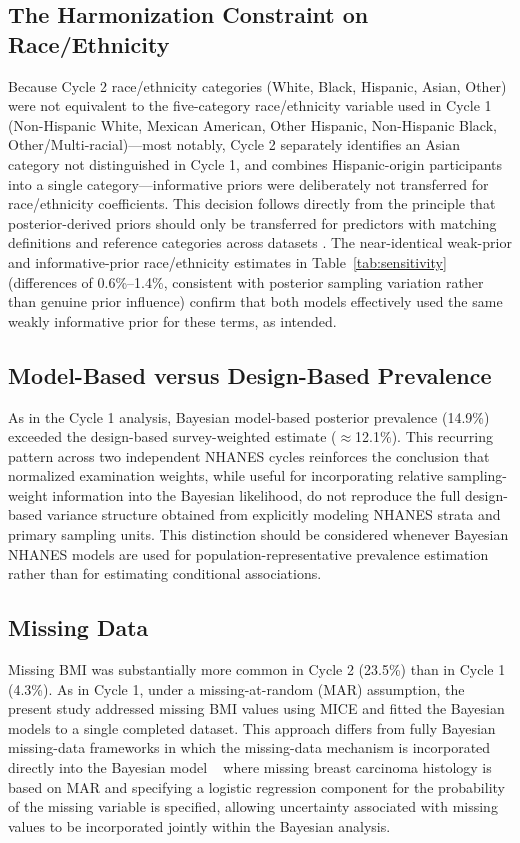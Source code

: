 \documentclass[11pt]{article}
\begin{document}
\subsection{The Harmonization Constraint on Race/Ethnicity}
Because Cycle 2 race/ethnicity categories (White, Black, Hispanic, Asian,
Other) were not equivalent to the five-category race/ethnicity variable used
in Cycle 1 (Non-Hispanic White, Mexican American, Other Hispanic,
Non-Hispanic Black, Other/Multi-racial)---most notably, Cycle 2 separately
identifies an Asian category not distinguished in Cycle 1, and combines
Hispanic-origin participants into a single category---informative priors
were deliberately not transferred for race/ethnicity coefficients. This
decision follows directly from the principle that posterior-derived priors
should only be transferred for predictors with matching definitions and
reference categories across datasets \citep{Baldwin2017}. The near-identical
weak-prior and informative-prior race/ethnicity estimates in
Table~\ref{tab:sensitivity} (differences of 0.6\%--1.4\%, consistent with
posterior sampling variation rather than genuine prior influence) confirm
that both models effectively used the same weakly informative prior for
these terms, as intended.

\subsection{Model-Based versus Design-Based Prevalence}
As in the Cycle 1 analysis, Bayesian model-based posterior prevalence
(14.9\%) exceeded the design-based survey-weighted estimate
($\approx$12.1\%). This recurring pattern across two independent NHANES
cycles reinforces the conclusion that normalized examination weights, while
useful for incorporating relative sampling-weight information into the
Bayesian likelihood, do not reproduce the full design-based variance
structure obtained from explicitly modeling NHANES strata and primary
sampling units. This distinction should be considered whenever Bayesian
NHANES models are used for population-representative prevalence estimation
rather than for estimating conditional associations.

\subsection{Missing Data}
Missing BMI was substantially more common in Cycle 2 (23.5\%) than in
Cycle 1 (4.3\%). As in Cycle 1, under a missing-at-random (MAR) assumption, the present study addressed missing BMI values using MICE and fitted the Bayesian models to a single completed dataset. This approach
differs from fully Bayesian missing-data frameworks in which the missing-data
mechanism is incorporated directly into the Bayesian model ~\cite{Luta2013Bayesian} where  missing breast carcinoma
histology is based on MAR and specifying a logistic regression component for
the probability of the missing variable is specified, allowing uncertainty associated
with missing values to be incorporated jointly within the Bayesian
analysis. 
\end{document}
